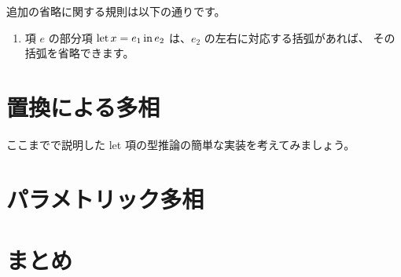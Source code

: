 追加の省略に関する規則は以下の通りです。

\begin{enumerate}
  \item 項 $e$ の部分項 $\mathrm{let} \, x = e_1 \, \mathrm{in} \, e_2$ は、$e_2$ の左右に対応する括弧があれば、
        その括弧を省略できます。
\end{enumerate}

\section{置換による多相}

ここまでで説明した let 項の型推論の簡単な実装を考えてみましょう。



\section{パラメトリック多相}



\section{まとめ}




